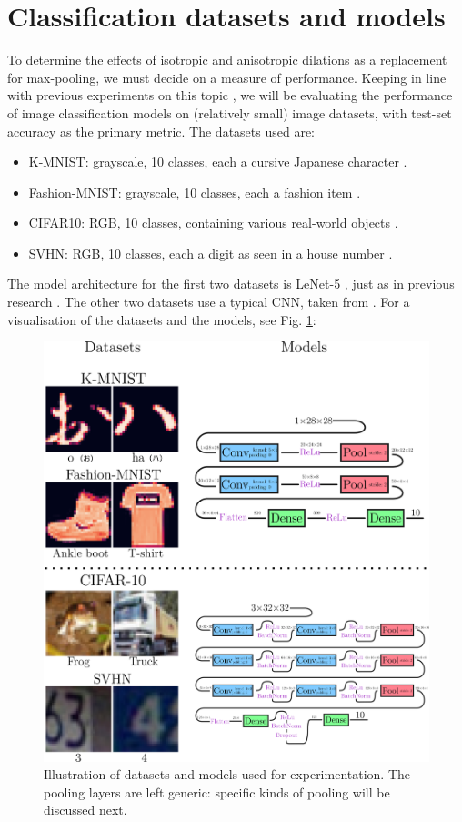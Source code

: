 \documentclass[a4paper, 12pt]{report}
\begin{document}
\section{Classification datasets and models}
To determine the effects of isotropic and anisotropic dilations as a replacement for max-pooling, we must decide on a measure of performance. Keeping in line with previous experiments on this topic \cite{groenendijk2022morphpool, thierrybsc, koenbsc}, we will be evaluating the performance of image classification models on (relatively small) image datasets, with test-set accuracy as the primary metric.
The datasets used are:
\begin{itemize}
\setlength{\itemsep}{0pt}
	\item K-MNIST: grayscale, 10 classes, each a cursive Japanese character \cite{k-mnist}. 
	\item Fashion-MNIST: grayscale, 10 classes, each a fashion item \cite{fashion-mnist}.
	\item CIFAR10: RGB, 10 classes, containing various real-world objects \cite{cifar10}.
	\item SVHN:  RGB, 10 classes, each a digit as seen in a house number \cite{svhn}.
\end{itemize}
The model architecture for the first two datasets is LeNet-5 \cite{lenet5}, just as in previous research \cite{thierrybsc}.
The other two datasets use a typical CNN, taken from \cite{model-cifar}.
For a visualisation of the datasets and the models, see Fig. \ref{fig:datasets}:
\begin{figure}[h!]
	\center
  \includegraphics[width=1\textwidth]{figures/datasets.png}
  \caption{Illustration of datasets and models used for experimentation.
  The pooling layers are left generic: specific kinds of pooling will be discussed next. }
  \label{fig:datasets}
\end{figure}
\end{document}
